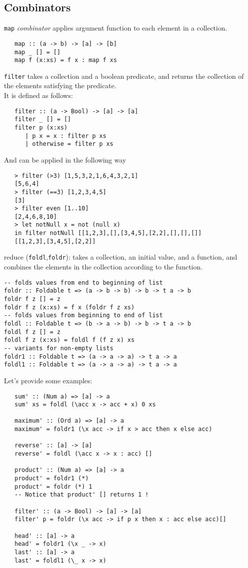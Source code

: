 \subsection{Combinators}
\lstinline|map| \textit{combinator} applies argument function to each element in
a collection.
\begin{lstlisting}
   map :: (a -> b) -> [a] -> [b]
   map _ [] = []
   map f (x:xs) = f x : map f xs
\end{lstlisting}

\lstinline|filter| takes a collection and a boolean predicate, and
returns the collection of the elements satisfying the
predicate.\\
It is defined as follows:
\begin{lstlisting}
   filter :: (a -> Bool) -> [a] -> [a]
   filter _ [] = []
   filter p (x:xs)
      | p x = x : filter p xs
      | otherwise = filter p xs
\end{lstlisting}
And can be applied in the following way
\begin{lstlisting}
   > filter (>3) [1,5,3,2,1,6,4,3,2,1]
   [5,6,4]
   > filter (==3) [1,2,3,4,5]
   [3]
   > filter even [1..10]
   [2,4,6,8,10]
   > let notNull x = not (null x)
   in filter notNull [[1,2,3],[],[3,4,5],[2,2],[],[],[]]
   [[1,2,3],[3,4,5],[2,2]]
\end{lstlisting}

reduce (\lstinline|foldl|,\lstinline|foldr|): takes a collection, an initial value,
and a function, and combines the elements in the
collection according to the function.

\begin{lstlisting}
-- folds values from end to beginning of list
foldr :: Foldable t => (a -> b -> b) -> b -> t a -> b
foldr f z [] = z
foldr f z (x:xs) = f x (foldr f z xs)
-- folds values from beginning to end of list
foldl :: Foldable t => (b -> a -> b) -> b -> t a -> b
foldl f z [] = z
foldl f z (x:xs) = foldl f (f z x) xs
-- variants for non-empty lists
foldr1 :: Foldable t => (a -> a -> a) -> t a -> a
foldl1 :: Foldable t => (a -> a -> a) -> t a -> a
\end{lstlisting}

Let's provide some examples:
\begin{lstlisting}
   sum' :: (Num a) => [a] -> a
   sum' xs = foldl (\acc x -> acc + x) 0 xs
   
   maximum' :: (Ord a) => [a] -> a
   maximum' = foldr1 (\x acc -> if x > acc then x else acc)
   
   reverse' :: [a] -> [a]
   reverse' = foldl (\acc x -> x : acc) []
   
   product' :: (Num a) => [a] -> a
   product' = foldr1 (*)
   product' = foldr (*) 1
   -- Notice that product' [] returns 1 !

   filter' :: (a -> Bool) -> [a] -> [a]
   filter' p = foldr (\x acc -> if p x then x : acc else acc)[]
   
   head' :: [a] -> a
   head' = foldr1 (\x _ -> x)
   last' :: [a] -> a
   last' = foldl1 (\_ x -> x)
\end{lstlisting}

